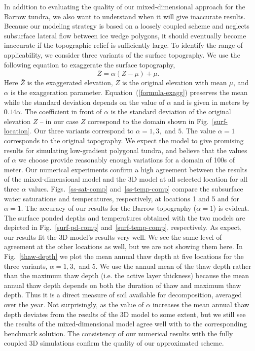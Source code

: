 \documentclass[review]{elsarticle}
\begin{document}
In addition to evaluating the quality of our mixed-dimensional approach for the Barrow tundra, we also want to understand when it will give inaccurate results. Because our modeling strategy is based on a loosely coupled scheme and neglects subsurface lateral flow between ice wedge polygons, it should eventually become inaccurate if the topographic relief is sufficiently large. To identify the range of applicability, we consider three variants of the surface topography.  We use the following equation to exaggerate the surface topography,
\begin{equation}\label{formula-exagg}
\bar{Z} =  \alpha (Z - \mu) + \mu.
\end{equation}
Here $\bar{Z}$ is the exaggerated elevation, $Z$ is the original elevation with mean $\mu$, and $\alpha$ is the exaggeration parameter. Equation~(\ref{formula-exagg})  preserves the mean while the standard deviation depends on the value of $\alpha$ and is given in meters by $0.14 \alpha$. The coefficient in front of $\alpha$ is the standard deviation of the original elevation $Z$ -- in our case $Z$ correspond to the domain shown in Fig.~\ref{surf-location}. Our three variants correspond to $\alpha=1,3,$ and $5$. The value $\alpha=1$ corresponds to the original topography. We expect the model to give promising results for simulating low-gradient polygonal tundra, and believe that the values of $\alpha$ we choose provide reasonably enough variations for a domain of 100s of meter. 
Our numerical experiments confirm a high agreement between the results of the mixed-dimensional model and the 3D model at all selected location for all three $\alpha$ values. Figs.~\ref{ss-sat-comp} and~\ref{ss-temp-comp} compare the subsurface water saturations and temperatures, respectively, at locations 1 and 5 and for $\alpha=1$. The accuracy of our results for the Barrow topography ($\alpha=1$) is evident. The surface ponded depths and temperatures obtained with the two models are depicted in Fig.~\ref{surf-pd-comp} and~\ref{surf-temp-comp}, respectively. As expect, our results fit the 3D model's results very well. We see the same level of agreement at the other locations as well, but we are not showing them here.
In Fig.~\ref{thaw-depth} we plot the mean annual thaw depth at five locations for the three variants, $\alpha =1, 3,$ and $5$. We use the annual mean of the thaw depth rather than the maximum thaw depth (i.e. the active layer thickness) because the mean annual thaw depth depends on both the duration of thaw and maximum thaw depth. Thus it is a direct measure of soil available for decomposition, averaged over the year. 
Not surprisingly, as the value of $\alpha$ increases the mean annual thaw depth deviates from the results of the 3D model to some extent, but we still see the results of the mixed-dimensional model agree well with to the corresponding benchmark solution. The consistency of our numerical results with the fully coupled 3D simulations confirm the quality of our approximated scheme. 
\end{document}
